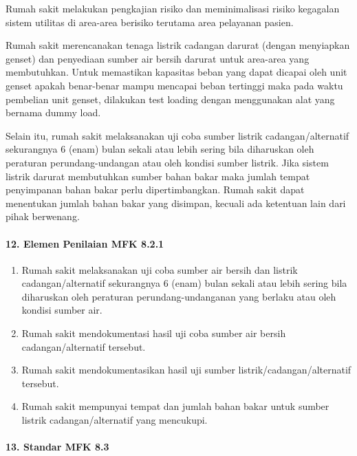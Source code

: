 \documentclass[
]{book}
\providecommand{\tightlist}{%
  \setlength{\itemsep}{0pt}\setlength{\parskip}{0pt}}
\begin{document}
Rumah sakit melakukan pengkajian risiko dan meminimalisasi risiko kegagalan sistem utilitas di area-area berisiko terutama area pelayanan pasien.

Rumah sakit merencanakan tenaga listrik cadangan darurat (dengan menyiapkan genset) dan penyediaan sumber air bersih darurat untuk area-area yang membutuhkan. Untuk memastikan kapasitas beban yang dapat dicapai oleh unit genset apakah benar-benar mampu mencapai beban tertinggi maka pada waktu pembelian unit genset, dilakukan test loading dengan menggunakan alat yang bernama dummy load.

Selain itu, rumah sakit melaksanakan uji coba sumber listrik cadangan/alternatif sekurangnya 6 (enam) bulan sekali atau lebih sering bila diharuskan oleh peraturan perundang-undangan atau oleh kondisi sumber listrik. Jika sistem listrik darurat membutuhkan sumber bahan bakar maka jumlah tempat penyimpanan bahan bakar perlu dipertimbangkan. Rumah sakit dapat menentukan jumlah bahan bakar yang disimpan, kecuali ada ketentuan lain dari pihak berwenang.

\hypertarget{elemen-penilaian-mfk-8.2.1}{%
\paragraph*{12. Elemen Penilaian MFK 8.2.1}\label{elemen-penilaian-mfk-8.2.1}}

\begin{enumerate}
\def\labelenumi{\alph{enumi}.}
\tightlist
\item
  Rumah sakit melaksanakan uji coba sumber air bersih dan listrik cadangan/alternatif sekurangnya 6 (enam) bulan sekali atau lebih sering bila diharuskan oleh peraturan perundang-undanganan yang berlaku atau oleh kondisi sumber air.
\item
  Rumah sakit mendokumentasi hasil uji coba sumber air bersih cadangan/alternatif tersebut.
\item
  Rumah sakit mendokumentasikan hasil uji sumber listrik/cadangan/alternatif tersebut.
\item
  Rumah sakit mempunyai tempat dan jumlah bahan bakar untuk sumber listrik cadangan/alternatif yang mencukupi.
\end{enumerate}

\hypertarget{standar-mfk-8.3}{%
\paragraph*{13. Standar MFK 8.3}\label{standar-mfk-8.3}}
\end{document}
